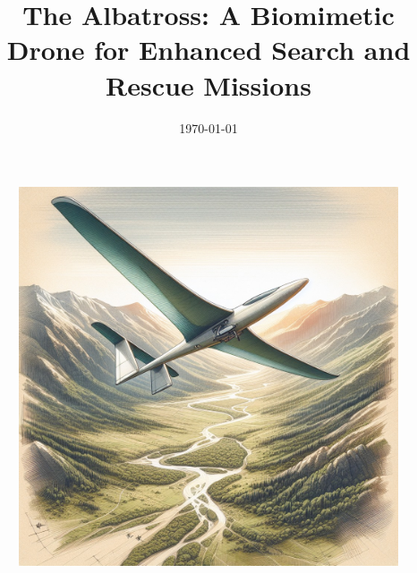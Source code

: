 \documentclass{uva-inf-article}
\title{The Albatross: A Biomimetic Drone for Enhanced Search and Rescue Missions}
\date{\today}
\begin{document}
\maketitle
\begin{figure}[h]
    \centering
    \includegraphics[width=.75\linewidth]{images/albatrone.jpg}
\end{figure}
\newpage


\tableofcontents






% 









\printbibliography


\appendix 


\end{document}
